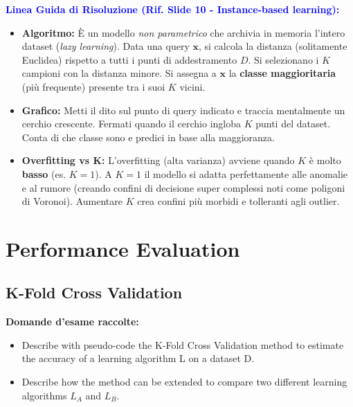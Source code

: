 \documentclass[11pt,a4paper]{article}
\begin{document}
\textbf{\textcolor{blue}{Linea Guida di Risoluzione (Rif. Slide 10 - Instance-based learning):}}
\begin{itemize}
    \item \textbf{Algoritmo:} È un modello \textit{non parametrico} che archivia in memoria l'intero dataset (\textit{lazy learning}). Data una query $\mathbf{x}$, si calcola la distanza (solitamente Euclidea) rispetto a tutti i punti di addestramento $D$. Si selezionano i $K$ campioni con la distanza minore. Si assegna a $\mathbf{x}$ la \textbf{classe maggioritaria} (più frequente) presente tra i suoi $K$ vicini.
    \item \textbf{Grafico:} Metti il dito sul punto di query indicato e traccia mentalmente un cerchio crescente. Fermati quando il cerchio ingloba $K$ punti del dataset. Conta di che classe sono e predici in base alla maggioranza.
    \item \textbf{Overfitting vs K:} L'overfitting (alta varianza) avviene quando $K$ è molto \textbf{basso} (es. $K=1$). A $K=1$ il modello si adatta perfettamente alle anomalie e al rumore (creando confini di decisione super complessi noti come poligoni di Voronoi). Aumentare $K$ crea confini più morbidi e tolleranti agli outlier.
\end{itemize}


\section{Performance Evaluation}

\subsection{K-Fold Cross Validation}
\textbf{Domande d'esame raccolte:}
\begin{itemize}
    \item Describe with pseudo-code the K-Fold Cross Validation method to estimate the accuracy of a learning algorithm L on a dataset D.
    \item Describe how the method can be extended to compare two different learning algorithms $L_A$ and $L_B$.
\end{itemize}
\end{document}
